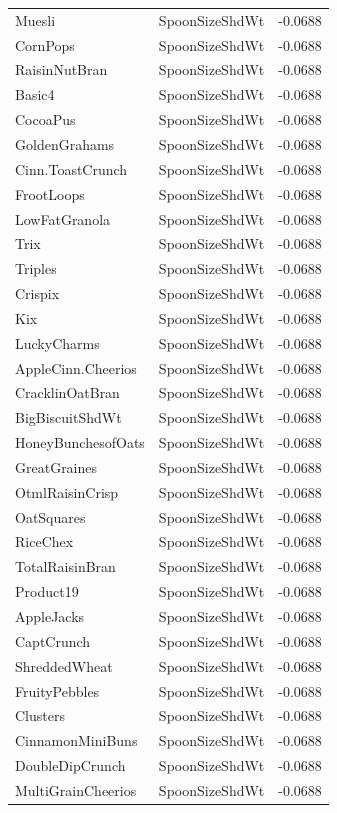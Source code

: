 \begin{longtable}{llr}
Muesli & SpoonSizeShdWt & -0.0688 \\
CornPops & SpoonSizeShdWt & -0.0688 \\
RaisinNutBran & SpoonSizeShdWt & -0.0688 \\
Basic4 & SpoonSizeShdWt & -0.0688 \\
CocoaPus & SpoonSizeShdWt & -0.0688 \\
GoldenGrahams & SpoonSizeShdWt & -0.0688 \\
Cinn.ToastCrunch & SpoonSizeShdWt & -0.0688 \\
FrootLoops & SpoonSizeShdWt & -0.0688 \\
LowFatGranola & SpoonSizeShdWt & -0.0688 \\
Trix & SpoonSizeShdWt & -0.0688 \\
Triples & SpoonSizeShdWt & -0.0688 \\
Crispix & SpoonSizeShdWt & -0.0688 \\
Kix & SpoonSizeShdWt & -0.0688 \\
LuckyCharms & SpoonSizeShdWt & -0.0688 \\
AppleCinn.Cheerios & SpoonSizeShdWt & -0.0688 \\
CracklinOatBran & SpoonSizeShdWt & -0.0688 \\
BigBiscuitShdWt & SpoonSizeShdWt & -0.0688 \\
HoneyBunchesofOats & SpoonSizeShdWt & -0.0688 \\
GreatGraines & SpoonSizeShdWt & -0.0688 \\
OtmlRaisinCrisp & SpoonSizeShdWt & -0.0688 \\
OatSquares & SpoonSizeShdWt & -0.0688 \\
RiceChex & SpoonSizeShdWt & -0.0688 \\
TotalRaisinBran & SpoonSizeShdWt & -0.0688 \\
Product19 & SpoonSizeShdWt & -0.0688 \\
AppleJacks & SpoonSizeShdWt & -0.0688 \\
CaptCrunch & SpoonSizeShdWt & -0.0688 \\
ShreddedWheat & SpoonSizeShdWt & -0.0688 \\
FruityPebbles & SpoonSizeShdWt & -0.0688 \\
Clusters & SpoonSizeShdWt & -0.0688 \\
CinnamonMiniBuns & SpoonSizeShdWt & -0.0688 \\
DoubleDipCrunch & SpoonSizeShdWt & -0.0688 \\
MultiGrainCheerios & SpoonSizeShdWt & -0.0688 \\

\end{longtable}
